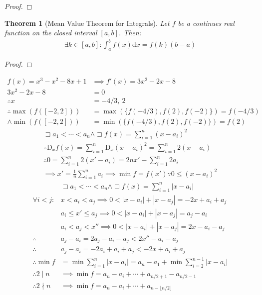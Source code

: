 \documentclass[a4paper,11pt]{article}
\theoremstyle{plain}
\newtheorem{theorem}{Theorem}
\theoremstyle{definition}
\newcommand{\dx}{\text{d}}
\newcommand{\D}{\text{D}}
\newcommand{\lett}{\sqsupset}
\begin{document}
\begin{proof}
\end{proof}
\begin{theorem}[Mean Value Theorem for Integrals]
	Let $f$ be a continues real function on the closed interval $[a,b]$. Then:
	\begin{equation}
	\begin{aligned}
		\exists k \in [a,b]: \int_a^b f(x) \dx x = f(k)(b-a)
	\end{aligned}
	\end{equation}
\end{theorem}
\begin{proof}
\end{proof}
\newpage
\begin{align*}
	f(x)=x^3-x^2-8x+1 &\implies f'(x)=3x^2-2x-8\\
	3x^2-2x-8 &= 0\\
	\therefore x &= -4/3,\ 2\\
	\therefore \max(f([-2,2]))&=\max(\{f(-4/3),f(2),f(-2)\})=f(-4/3)\\
	\land \min(f([-2,2]))&=\min(\{f(-4/3),f(2),f(-2)\})=f(2)
\end{align*}
\begin{align*}
	\lett a_1<\cdots<a_n\land \lett f(x)=\sum_{i=1}^n {(x-a_i)}^2\\
	\therefore \D_x f(x)=\sum_{i=1}^n \D_x{(x-a_i)}^2=
	\sum_{i=1}^n 2(x-a_i)\\
	\therefore 0=\sum_{i=1}^n 2(x'-a_i)=2nx'-\sum_{i=1}^n 2a_i\\
	\implies x'=\frac{1}{n}\sum_{i=1}^n a_i \implies \min f = f(x')\because
	0\leq {(x-a_i)}^2
\end{align*}
\begin{align*}
	&\lett a_1<\cdots<a_n\land \lett f(x)=\sum_{i=1}^n |x-a_i|\\
	\forall i<j:&x<a_i<a_j \implies 0<|x-a_i|+|x-a_j|=-2x+a_i+a_j\\
				&a_i\leq x'\leq a_j\implies0<|x-a_i|+|x-a_j|=a_j-a_i\\
				& a_i<a_j<x'' \implies 0<|x-a_i|+|x-a_j|=2x-a_i-a_j\\
	\therefore& a_j-a_i=2a_j-a_i-a_j<2x''-a_i-a_j\\
	\therefore& a_j-a_i=-2a_i+a_i+a_j<-2x+a_i+a_j\\
	\therefore\min f &= \min \sum_{i=1}^n |x-a_i| 
	= a_n-a_1+\min \sum_{i=2}^{n-1} |x-a_i|\\
	\therefore 2\mid n &\implies \min f= a_n-a_i+\cdots+a_{n/2+1}-a_{n/2-1}\\
	\therefore 2\nmid n &\implies \min f=a_n-a_i+\cdots+a_{n-\lfloor n/2\rfloor}
\end{align*}
\end{document}

